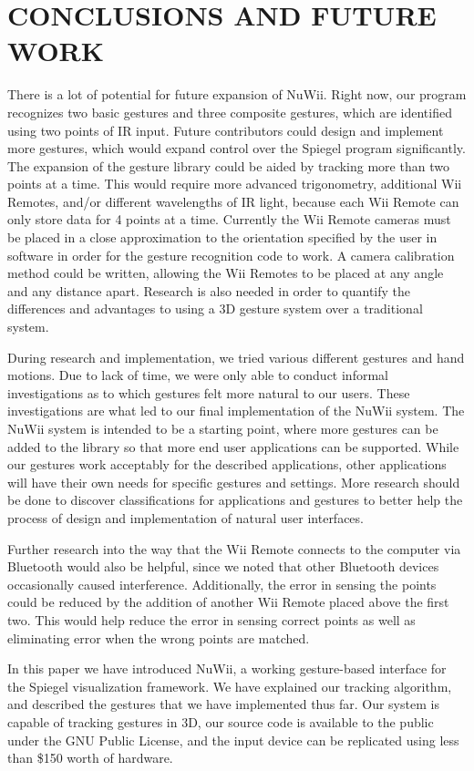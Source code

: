 \documentclass[a4paper,twoside]{article}
\begin{document}
\section{\uppercase{Conclusions and Future Work}} There is a lot of potential
for future expansion of NuWii. Right now, our program recognizes two basic
gestures and three composite gestures, which are identified using two points of
IR input. Future contributors could design and implement more gestures, which
would expand control over the Spiegel program significantly. The expansion of
the gesture library could be aided by tracking more than two points at a time.
This would require more advanced trigonometry, additional Wii Remotes, and/or
different wavelengths of IR light, because each Wii Remote can only store data
for 4 points at a time. Currently the Wii Remote cameras must be placed in a
close approximation to the orientation specified by the user in software in
order for the gesture recognition code to work. A camera calibration method
could be written, allowing the Wii Remotes to be placed at any angle and any
distance apart.  Research is also needed in order to quantify the differences
and advantages to using a 3D gesture system over a traditional system. 

During research and implementation, we tried various different gestures and
hand motions. Due to lack of time, we were only able to conduct informal
investigations as to which gestures felt more natural to our users. These
investigations are what led to our final implementation of the NuWii system.
The NuWii system is intended to be a starting point, where more gestures can be
added to the library so that more end user applications can be supported. While
our gestures work acceptably for the described applications, other applications
will have their own needs for specific gestures and settings. More research
should be done to discover classifications for applications and gestures to
better help the process of design and implementation of natural user
interfaces.

Further research into the way that the Wii Remote connects to the
computer via Bluetooth would also be helpful, since we noted that other
Bluetooth devices occasionally caused interference. Additionally, the error in
sensing the points could be reduced by the addition of another Wii Remote placed
above the first two. This would help reduce the error in sensing correct points
as well as eliminating error when the wrong points are matched.

In this paper we have introduced NuWii, a working gesture-based interface for
the Spiegel visualization framework. We have explained our tracking algorithm,
and described the gestures that we have implemented thus far. Our system is
capable of tracking gestures in 3D, our source code is available to the public
under the GNU Public License, and the input device can be replicated using less
than \$150 worth of hardware. 
    
\end{document}
